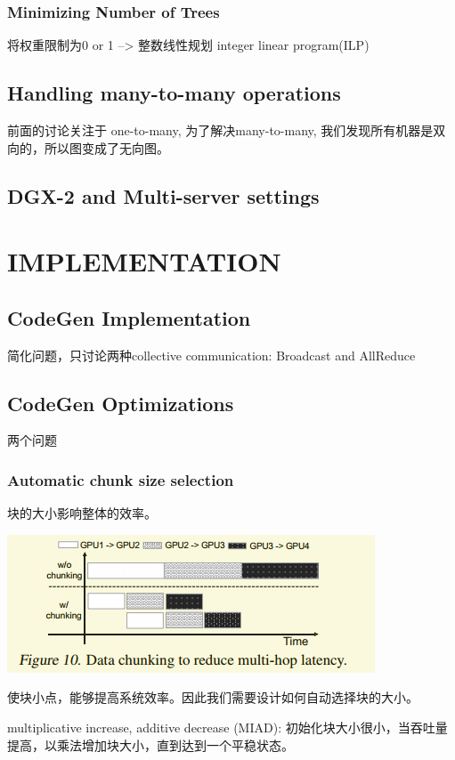 \documentclass[11pt]{article}
\begin{document}
\subsubsection{Minimizing Number of Trees}
\label{sec:org300e847}
将权重限制为0 or 1 --> 整数线性规划 integer linear program(ILP)
\subsection{Handling many-to-many operations}
\label{sec:org3db7eee}
前面的讨论关注于 one-to-many, 为了解决many-to-many, 我们发现所有机器是双向的，所以图变成了无向图。
\subsection{DGX-2 and Multi-server settings}
\label{sec:org7315e3c}
\section{IMPLEMENTATION}
\label{sec:org773bb70}
\subsection{CodeGen Implementation}
\label{sec:orgd276d13}
简化问题，只讨论两种collective communication: Broadcast and AllReduce
\subsection{CodeGen Optimizations}
\label{sec:org919ae65}
两个问题
\subsubsection{Automatic chunk size selection}
\label{sec:org5a3556a}
块的大小影响整体的效率。
\begin{center}
\includegraphics[width=.9\linewidth]{Blink.org_imgs/20201111_202947_MalqKw.png}
\end{center}
使块小点，能够提高系统效率。因此我们需要设计如何自动选择块的大小。

multiplicative increase, additive decrease (MIAD): 初始化块大小很小，当吞吐量提高，以乘法增加块大小，直到达到一个平稳状态。
\end{document}
